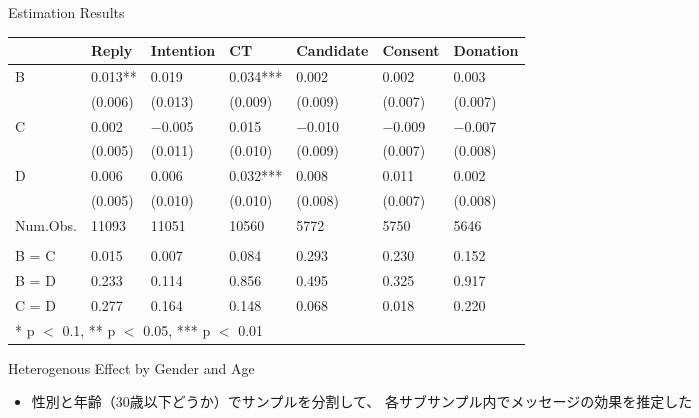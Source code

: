 \documentclass[
      aspectratio=169,
        12pt,
    ]{beamer}
\providecommand{\tightlist}{%
  \setlength{\itemsep}{0pt}\setlength{\parskip}{0pt}}
\begin{document}
\begin{frame}{Estimation Results}
\protect\hypertarget{estimation-results}{}
\begin{table}
\centering
\fontsize{9}{11}\selectfont
\begin{tabular}[t]{l>{\centering\arraybackslash}p{5em}>{\centering\arraybackslash}p{5em}>{\centering\arraybackslash}p{5em}>{\centering\arraybackslash}p{5em}>{\centering\arraybackslash}p{5em}>{\centering\arraybackslash}p{5em}}
\toprule
  & Reply & Intention & CT & Candidate & Consent & Donation\\
\midrule
B & \num{0.013}** & \num{0.019} & \num{0.034}*** & \num{0.002} & \num{0.002} & \num{0.003}\\
 & (\num{0.006}) & (\num{0.013}) & (\num{0.009}) & (\num{0.009}) & (\num{0.007}) & (\num{0.007})\\
C & \num{0.002} & \num{-0.005} & \num{0.015} & \num{-0.010} & \num{-0.009} & \num{-0.007}\\
 & (\num{0.005}) & (\num{0.011}) & (\num{0.010}) & (\num{0.009}) & (\num{0.007}) & (\num{0.008})\\
D & \num{0.006} & \num{0.006} & \num{0.032}*** & \num{0.008} & \num{0.011} & \num{0.002}\\
 & (\num{0.005}) & (\num{0.010}) & (\num{0.010}) & (\num{0.008}) & (\num{0.007}) & (\num{0.008})\\
\midrule
Num.Obs. & \num{11093} & \num{11051} & \num{10560} & \num{5772} & \num{5750} & \num{5646}\\
\addlinespace[0.3em]
\multicolumn{7}{l}{\textit{F-tests, p-value}}\\
\hspace{1em}B = C & \num{0.015} & \num{0.007} & \num{0.084} & \num{0.293} & \num{0.230} & \num{0.152}\\
\hspace{1em}B = D & \num{0.233} & \num{0.114} & \num{0.856} & \num{0.495} & \num{0.325} & \num{0.917}\\
\hspace{1em}C = D & \num{0.277} & \num{0.164} & \num{0.148} & \num{0.068} & \num{0.018} & \num{0.220}\\
\bottomrule
\multicolumn{7}{l}{\rule{0pt}{1em}* p $<$ 0.1, ** p $<$ 0.05, *** p $<$ 0.01}\\
\end{tabular}
\end{table}
\end{frame}

\begin{frame}{Heterogenous Effect by Gender and Age}
\protect\hypertarget{heterogenous-effect-by-gender-and-age}{}
\begin{itemize}
\tightlist
\item
  性別と年齢（30歳以下どうか）でサンプルを分割して、
  各サブサンプル内でメッセージの効果を推定した
\end{itemize}
\end{frame}
\end{document}
